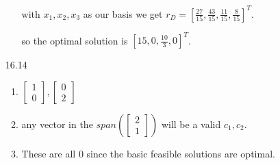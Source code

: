 \documentclass[10pt,a4paper]{article}
\newcommand\m[1]{\begin{bmatrix}#1\end{bmatrix}}
\begin{document}
\begin{enumerate}
\begin{enumerate}
        with $x_1, x_2, x_3$ as our basis we get $r_D = [\frac{27}{15}, \frac{43}{15}, \frac{11}{15}, \frac{8}{15}]^T$.

        so the optimal solution is $[15, 0, \frac{10}{3}, 0]^T$.

    \end{enumerate}

    \item [16.14]
    \begin{enumerate}
        \item $\m{1 \\ 0}, \m{0 \\ 2}$
        \item any vector in the $span(\m{2 \\ 1})$ will be a valid $c_1, c_2$.
        \item These are all 0 since the basic feasible solutions are optimal. 
    \end{enumerate}

\end{enumerate}
\end{document}

